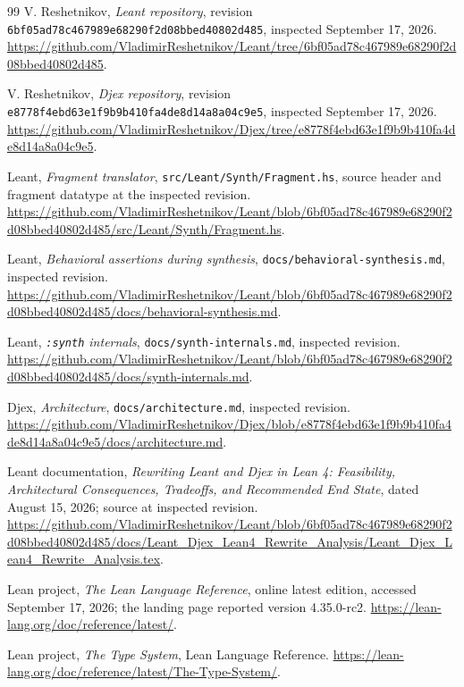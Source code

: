 \documentclass[11pt,letterpaper]{article}
\newcommand{\pathref}[1]{\nolinkurl{#1}}
\theoremstyle{definition}
\theoremstyle{remark}
\begin{document}
\begin{thebibliography}{99}
\small
{}
V. Reshetnikov, \emph{Leant repository}, revision
\pathref{6bf05ad78c467989e68290f2d08bbed40802d485}, inspected September 17, 2026.
\url{https://github.com/VladimirReshetnikov/Leant/tree/6bf05ad78c467989e68290f2d08bbed40802d485}.

V. Reshetnikov, \emph{Djex repository}, revision
\pathref{e8778f4ebd63e1f9b9b410fa4de8d14a8a04c9e5}, inspected September 17, 2026.
\url{https://github.com/VladimirReshetnikov/Djex/tree/e8778f4ebd63e1f9b9b410fa4de8d14a8a04c9e5}.

Leant, \emph{Fragment translator}, \pathref{src/Leant/Synth/Fragment.hs}, source header and fragment datatype at the inspected revision.
\url{https://github.com/VladimirReshetnikov/Leant/blob/6bf05ad78c467989e68290f2d08bbed40802d485/src/Leant/Synth/Fragment.hs}.

Leant, \emph{Behavioral assertions during synthesis}, \pathref{docs/behavioral-synthesis.md}, inspected revision.
\url{https://github.com/VladimirReshetnikov/Leant/blob/6bf05ad78c467989e68290f2d08bbed40802d485/docs/behavioral-synthesis.md}.

Leant, \emph{\texttt{:synth} internals}, \pathref{docs/synth-internals.md}, inspected revision.
\url{https://github.com/VladimirReshetnikov/Leant/blob/6bf05ad78c467989e68290f2d08bbed40802d485/docs/synth-internals.md}.

Djex, \emph{Architecture}, \pathref{docs/architecture.md}, inspected revision.
\url{https://github.com/VladimirReshetnikov/Djex/blob/e8778f4ebd63e1f9b9b410fa4de8d14a8a04c9e5/docs/architecture.md}.

Leant documentation, \emph{Rewriting Leant and Djex in Lean 4: Feasibility, Architectural Consequences, Tradeoffs, and Recommended End State}, dated August 15, 2026; source at inspected revision.
\url{https://github.com/VladimirReshetnikov/Leant/blob/6bf05ad78c467989e68290f2d08bbed40802d485/docs/Leant_Djex_Lean4_Rewrite_Analysis/Leant_Djex_Lean4_Rewrite_Analysis.tex}.

Lean project, \emph{The Lean Language Reference}, online latest edition, accessed September 17, 2026; the landing page reported version 4.35.0-rc2.
\url{https://lean-lang.org/doc/reference/latest/}.

Lean project, \emph{The Type System}, Lean Language Reference.
\url{https://lean-lang.org/doc/reference/latest/The-Type-System/}.


\end{thebibliography}
\end{document}

